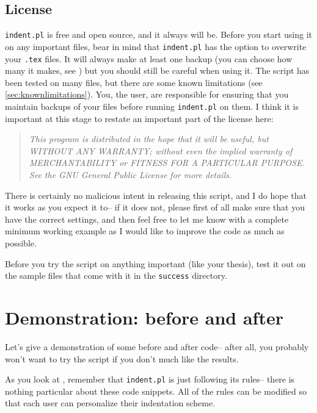 \subsection{License}
\lstinline!indent.pl! is free and open source, and it always will be.
Before you start using it on any important files, bear in mind that \lstinline!indent.pl! has the option to overwrite your \lstinline!.tex! files.
It will always make at least one backup (you can choose how many it makes, see )
but you should still be careful when using it. The script has been tested on many
files, but there are some known limitations (see \cref{sec:knownlimitations}). 
You, the user, are responsible for ensuring that you maintain backups of your files
before running \lstinline!indent.pl! on them. I think it is important at this
stage to restate an important part of the license here:
\begin{quote}\itshape
	This program is distributed in the hope that it will be useful,
	but WITHOUT ANY WARRANTY; without even the implied warranty of
	MERCHANTABILITY or FITNESS FOR A PARTICULAR PURPOSE.  See the
	GNU General Public License for more details.
\end{quote}
There is certainly no malicious intent in releasing this script, and I do hope
that it works as you expect it to-- if it does not, please first of all 
make sure that you have the correct settings, and then feel free to let me know with a 
complete minimum working example as I would like to improve the code as much as possible. 
 	 	 	 	 	
\begin{warning}
	Before you try the script on anything important (like your thesis), test it 
	out on the sample files that come with it in the \lstinline!success! directory. 
\end{warning}
 	 	 	 	 
 	 	 	 	 	
\section{Demonstration: before and after}
Let's give a demonstration of some before and after code-- after all, you probably
won't want to try the script if you don't much like the results.
     
As you look at , remember
that \lstinline!indent.pl! is just following its rules-- there is nothing 
particular about these code snippets. All of the rules can be modified 
so that each user can personalize their indentation scheme. 

